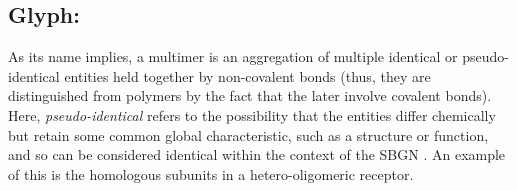 \subsection{Glyph: }
\label{sec:multimer}

As its name implies, a multimer is an aggregation of multiple identical or pseudo-identical entities held together by non-covalent bonds (thus, they are distinguished from polymers by the fact that the later involve covalent bonds).
Here,  \emph{pseudo-identical} refers to the possibility that the entities differ chemically but retain some common global characteristic, such as a structure or function, and so can be considered identical within the context of the SBGN \PD.
An example of this is the homologous subunits in a hetero-oligomeric receptor.

